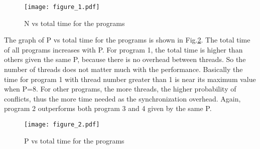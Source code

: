 \documentclass[12pt]{article}
\begin{document}
\begin{figure}[h!]
	\begin{center}
		\texttt{[image: figure\_1.pdf]}
		\caption{\label{fig:1}N vs total time for the programs}
	\end{center}
\end{figure}
The graph of P vs total time for the programs is shown in Fig.\ref{fig:2}.
The total time of all programs increases with P. For program 1, the total time
is higher than others given the same P, because there is no overhead between 
threads. So the number of threads does not matter much with the performance.
Basically the time for program 1 with thread number greater than 1 is near its
maximum value when P=8. For other programs, the more threads, the higher 
probability of conflicts, thus the more time needed as the synchronization 
overhead. Again, program 2 outperforms both program 3 and 4 given by the 
same P.

\begin{figure}[h!]
	\begin{center}
		\texttt{[image: figure\_2.pdf]}
		\caption{\label{fig:2}P vs total time for the programs}
	\end{center}
\end{figure}
\end{document}
